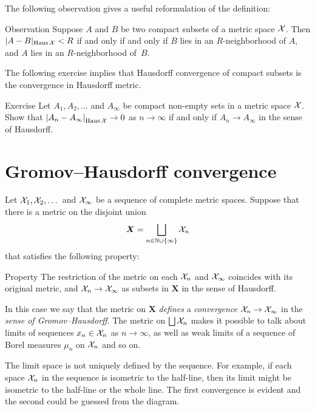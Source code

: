 The following observation gives a useful reformulation of the definition:

\begin{thm}{Observation}\label{obs:Haus-nbhds}
Suppose $A$ and $B$ be two compact subsets of a metric space $\mathcal{X}$.
Then $|A-B|_{\operatorname{\rm Haus}\nolimits\mathcal{X}}< R$ if and only if and only if 
$B$ lies in an $R$-neighborhood of $A$, 
and 
$A$ lies in an $R$-neighborhood of~$B$.
\end{thm}

The following exercise implies that Hausdorff convergence of compact subsets is the convergence in Hausdorff metric.

\begin{thm}{Exercise}\label{ex:Haus-conv}
Let $A_1,A_2,\dots$ and $A_\infty$ be compact non-empty sets in a metric space $\mathcal{X}$.
Show that $|{A_n}-{A_\infty}|_{\operatorname{\rm Haus}\nolimits\mathcal{X}}^{{}}\to 0$ as $n\to\infty$
if and only if $A_n\to A_\infty$ in the sense of Hausdorff.
\end{thm}

\section{Gromov--Hausdorff convergence}\label{sec:Gromov--Hausdorff}

Let $\mathcal{X}_1,\mathcal{X}_2,\dots$ and $\mathcal{X}_\infty$ be a sequence of complete metric spaces.
Suppose that there is a metric on the disjoint union 
\[\bm{X}=\bigsqcup_{n\in \mathbb{N}\cup\{\infty\}} \mathcal{X}_n\] 
that satisfies the following property:

\begin{thm}{Property}\label{propery:GH}
The restriction of the metric on each $\mathcal{X}_n$ and $\mathcal{X}_\infty$ coincides with its original metric, 
and $\mathcal{X}_n\to \mathcal{X}_\infty$ as subsets in $\bm{X}$ in the sense of Hausdorff.
\end{thm}

In this case we say that the metric on $\bm{X}$ \textit{defines} a \emph{convergence} $\mathcal{X}_n\to \mathcal{X}_\infty$ in the {}\emph{sense of Gromov--Hausdorff}.
The metric on  $\bigsqcup \mathcal{X}_n$ makes it possible to talk about limits of sequences $x_n\in \mathcal{X}_n$ as $n\to\infty$, as well as weak limits of a sequence of Borel measures $\mu_n$ on $\mathcal{X}_n$ and so on.

The limit space is not uniquely defined by the sequence.
For example, if each space $\mathcal{X}_n$ in the sequence is isometric to the half-line, then its limit might be isometric to the half-line or the whole line.
The first convergence is evident and the second could be guessed from the diagram.

